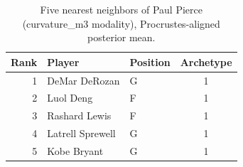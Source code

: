 \begin{table}[htbp]
  \centering\small
  \begin{tabular}{rllc}
    \toprule
    Rank & Player & Position & Archetype \\
    \midrule
    1 & DeMar DeRozan & G & 1 \\
    2 & Luol Deng & F & 1 \\
    3 & Rashard Lewis & F & 1 \\
    4 & Latrell Sprewell & G & 1 \\
    5 & Kobe Bryant & G & 1 \\
    \bottomrule
  \end{tabular}
  \caption{Five nearest neighbors of Paul Pierce (curvature_m3 modality), Procrustes-aligned posterior mean.}
  \label{tab:Paul_Pierce_neighbors_curvature_m3}
\end{table}

